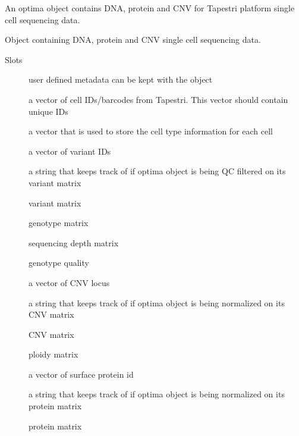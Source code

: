 \documentclass[a4paper]{book}
\begin{document}
%
\begin{Description}\relax
An optima object contains DNA, protein and CNV for Tapestri platform
single cell sequencing data.
\end{Description}
%
\begin{Value}
Object containing DNA, protein and CNV single cell sequencing data.
\end{Value}
%
\begin{Section}{Slots}

\begin{description}

\item[] user defined metadata can be kept with the object

\item[] a vector of cell IDs/barcodes from Tapestri. This
vector should contain unique IDs

\item[] a vector that is used to store the cell type information
for each cell

\item[] a vector of variant IDs

\item[] a string that keeps track of if optima object is being QC filtered
on its variant matrix

\item[] variant matrix

\item[] genotype matrix

\item[] sequencing depth matrix

\item[] genotype quality

\item[] a vector of CNV locus

\item[] a string that keeps track of if optima object is being normalized
on its CNV matrix

\item[] CNV matrix

\item[] ploidy matrix

\item[] a vector of surface protein id

\item[] a string that keeps track of if optima object is being normalized
on its protein matrix

\item[] protein matrix

\end{description}
\end{Section}
\end{document}
